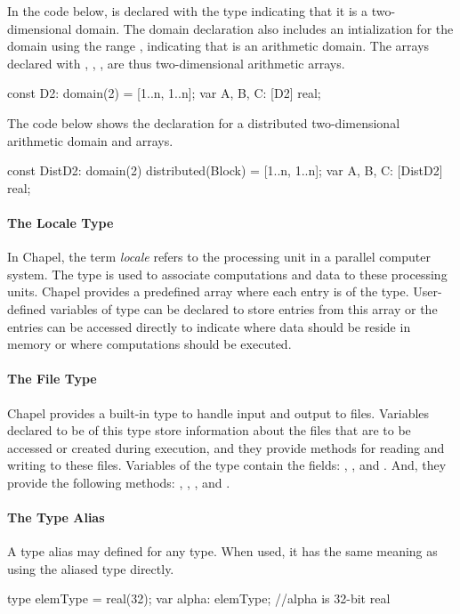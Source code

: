 \begin{example}
In the code below,  is declared with the type 
indicating that it is a two-dimensional domain.  The domain declaration
also includes an intialization for the domain using the range ,
indicating that  is an arithmetic domain.  The arrays declared
with , , ,  are thus two-dimensional
arithmetic arrays.
\begin{chapel}
const D2: domain(2) = [1..n, 1..n];
var A, B, C: [D2] real;
\end{chapel}

The code below shows the declaration for a distributed two-dimensional 
arithmetic domain and arrays.
\begin{chapel}
const DistD2: domain(2) distributed(Block) = [1..n, 1..n];
var A, B, C: [DistD2] real;
\end{chapel}
\end{example}

\paragraph{The Locale Type}
In Chapel, the term {\em locale} refers to the processing unit in a parallel
computer system.  The  type is used to associate 
computations and data to these processing units.  Chapel provides
a predefined array  where each entry is of the 
type.  User-defined variables of  type can be declared to store 
entries from this  array or the entries can be accessed 
directly to indicate where data should be reside in memory or where computations
should be executed.   

\paragraph{The File Type}
Chapel provides a built-in  type to handle input and
output to files.  Variables declared to be of this type store
information about the files that are to be accessed or created during
execution, and they provide methods for reading and writing to these
files.  Variables of the  type contain the
fields:  , , and .
And, they provide the following methods:
, , ,  and .

\paragraph{The Type Alias}
A type alias may defined for any type.  When used, it has the
same meaning as using the aliased type directly.
\begin{chapel}
type elemType = real(32);
var alpha: elemType; //alpha is 32-bit real
\end{chapel}

